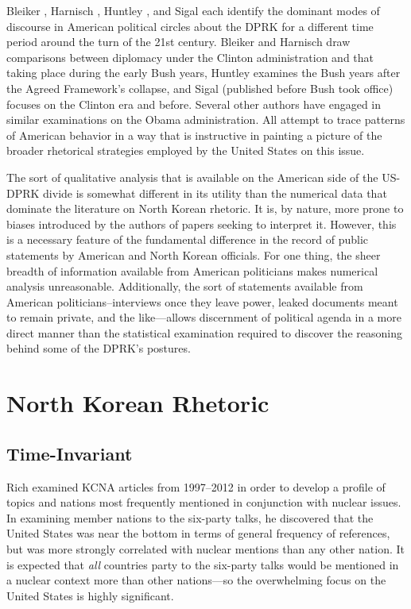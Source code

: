Bleiker \cite{bleiker}, Harnisch \cite{harnisch}, Huntley \cite{huntley}, and Sigal \cite{sigal} each identify the dominant modes of discourse in American political circles about the DPRK for a different time period around the turn of the 21st century. Bleiker and Harnisch draw comparisons between diplomacy under the Clinton administration and that taking place during the early Bush years, Huntley examines the Bush years after the Agreed Framework's collapse, and Sigal (published before Bush took office) focuses on the Clinton era and before. Several other authors \cite{crs13,green} have engaged in similar examinations on the Obama administration. All attempt to trace patterns of American behavior in a way that is instructive in painting a picture of the broader rhetorical strategies employed by the United States on this issue.

The sort of qualitative analysis that is available on the American side of the US-DPRK divide is somewhat different in its utility than the numerical data that dominate the literature on North Korean rhetoric. It is, by nature, more prone to biases introduced by the authors of papers seeking to interpret it. However, this is a necessary feature of the fundamental difference in the record of public statements by American and North Korean officials. For one thing, the sheer breadth of information available from American politicians makes numerical analysis unreasonable. Additionally, the sort of statements available from American politicians--interviews once they leave power, leaked documents meant to remain private, and the like---allows discernment of political agenda in a more direct manner than the statistical examination required to discover the reasoning behind some of the DPRK's postures. %

\section{North Korean Rhetoric}
\subsection{Time-Invariant}
Rich \cite{rich14} examined KCNA articles from 1997--2012 in order to develop a profile of topics and nations most frequently mentioned in conjunction with nuclear issues. In examining member nations to the six-party talks, he discovered that the United States was near the bottom in terms of general frequency of references, but was more strongly correlated with nuclear mentions than any other nation. It is expected that \emph{all} countries party to the six-party talks would be mentioned in a nuclear context more than other nations---so the overwhelming focus on the United States is highly significant.

